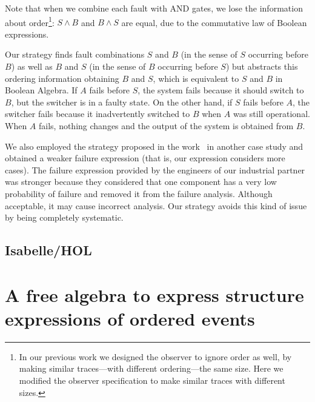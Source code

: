 \documentclass[12pt,openright,twoside,a4paper,oldfontcommands,english,brazil,final]{abntex2}
\theoremstyle{theo}
\begin{document}
Note that when we combine each fault with \ac{AND} gates, we lose the information about order\footnote{In our previous work we designed the observer to ignore order as well, by making similar traces---with different ordering---the same size. Here we modified the observer specification to make similar traces with different sizes.}: $S \land B$ and $B \land S$ are equal, due to the commutative law of Boolean expressions.

Our strategy finds fault combinations $S$ and $B$ (in the sense of $S$ occurring before $B$) as well as $B$ and $S$ (in the sense of $B$ occurring before $S$) but abstracts this ordering information obtaining $B$ and $S$, which is equivalent to $S$ and $B$ in Boolean Algebra.
%
If $A$ fails before $S$, the system fails because it should switch to $B$, but the switcher is in a faulty state.
%
On the other hand, if $S$ fails before $A$, the switcher fails because it inadvertently switched to $B$ when $A$ was still operational.
%
When $A$ fails, nothing changes and the output of the system is obtained from $B$.

We also employed the strategy proposed in the work~\cite{DM2012} in another case study and obtained a weaker failure expression (that is, our expression considers more cases).
The failure expression provided by the engineers of our industrial partner was stronger because they considered that one component has a very low probability of failure and removed it from the failure analysis.
Although acceptable, it may cause incorrect analysis.
Our strategy avoids this kind of issue by being completely systematic.

\section{Isabelle/HOL}
\label{sec:isabelle}




\chapter{A free algebra to express structure expressions of ordered events}
\label{chap:strategy}
\end{document}
